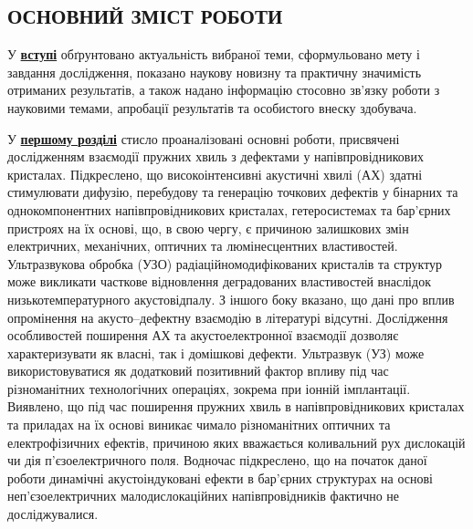 

\begin{center}
\section*{\MakeUppercase{ОСНОВНИЙ ЗМІСТ РОБОТИ}}
\end{center}

У  \underline{\textbf{вступі}}  обґрунтовано актуальність  вибраної  теми, сформульовано  мету  і
завдання  дослідження, показано  наукову  новизну  та практичну  значимість
отриманих результатів, а також надано інформацію стосовно зв’язку роботи з науковими темами, апробації результатів та
особистого внеску здобувача.


У  \underline{\textbf{першому розділі}}   стисло проаналізовані основні роботи, присвячені
дослідженням взаємодії пружних хвиль з дефектами у напівпровідникових кристалах.
Підкреслено, що високоінтенсивні акустичні хвилі (АХ) здатні стимулювати дифузію, перебудову та генерацію точкових дефектів у бінарних та однокомпонентних напівпровідникових кристалах, гетеросистемах та бар'єрних пристроях на їх основі,
що, в свою чергу, є причиною залишкових змін електричних, механічних, оптичних та  люмінесцентних властивостей.
Ультразвукова обробка (УЗО) радіаційномодифікованих кристалів та структур може викликати часткове відновлення деградованих властивостей внаслідок низькотемпературного акустовідпалу.
З іншого боку вказано, що дані про вплив опромінення на акусто--дефектну взаємодію в літературі відсутні.
Дослідження особливостей поширення АХ та акустоелектронної взаємодії дозволяє характеризувати як власні, так і домішкові дефекти.
Ультразвук (УЗ) може використовуватися як додатковий позитивний фактор впливу під час різноманітних технологічних  операціях, зокрема при іонній імплантації.
Виявлено, що під час поширення пружних хвиль в напівпровідникових кристалах та приладах на їх основі виникає чимало різноманітних оптичних та електрофізичних ефектів, причиною яких вважається коливальний рух дислокацій чи дія п'єзоелектричного поля.
Водночас підкреслено,
що на початок даної роботи динамічні акустоіндуковані ефекти в бар'єрних структурах на основі неп'єзоелектричних малодислокаційних напівпровідників фактично не досліджувалися.

